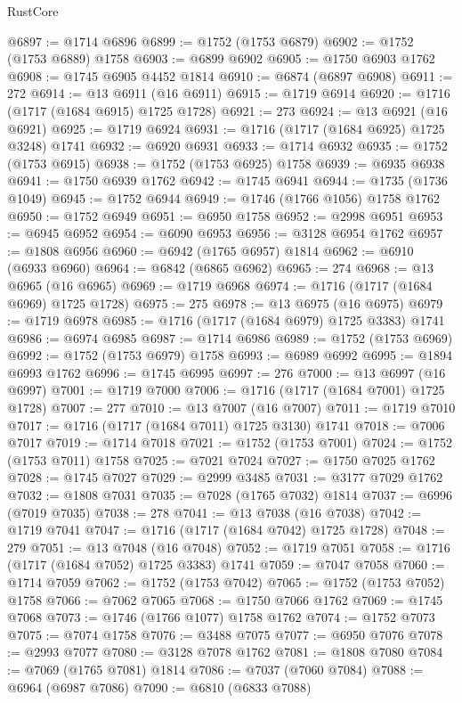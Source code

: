 \begin{lexlean}{RustCore}
\begin{coremodule}
@6897 := @1714 @6896
@6899 := @1752 (@1753 @6879)
@6902 := @1752 (@1753 @6889) @1758
@6903 := @6899 @6902
@6905 := @1750 @6903 @1762
@6908 := @1745 @6905 @4452 @1814
@6910 := @6874 (@6897 @6908)
@6911 := 272
@6914 := @13 @6911 (@16 @6911)
@6915 := @1719 @6914
@6920 := @1716 (@1717 (@1684 @6915) @1725 @1728)
@6921 := 273
@6924 := @13 @6921 (@16 @6921)
@6925 := @1719 @6924
@6931 := @1716 (@1717 (@1684 @6925) @1725 @3248) @1741
@6932 := @6920 @6931
@6933 := @1714 @6932
@6935 := @1752 (@1753 @6915)
@6938 := @1752 (@1753 @6925) @1758
@6939 := @6935 @6938
@6941 := @1750 @6939 @1762
@6942 := @1745 @6941
@6944 := @1735 (@1736 @1049)
@6945 := @1752 @6944
@6949 := @1746 (@1766 @1056) @1758 @1762
@6950 := @1752 @6949
@6951 := @6950 @1758
@6952 := @2998 @6951
@6953 := @6945 @6952
@6954 := @6090 @6953
@6956 := @3128 @6954 @1762
@6957 := @1808 @6956
@6960 := @6942 (@1765 @6957) @1814
@6962 := @6910 (@6933 @6960)
@6964 := @6842 (@6865 @6962)
@6965 := 274
@6968 := @13 @6965 (@16 @6965)
@6969 := @1719 @6968
@6974 := @1716 (@1717 (@1684 @6969) @1725 @1728)
@6975 := 275
@6978 := @13 @6975 (@16 @6975)
@6979 := @1719 @6978
@6985 := @1716 (@1717 (@1684 @6979) @1725 @3383) @1741
@6986 := @6974 @6985
@6987 := @1714 @6986
@6989 := @1752 (@1753 @6969)
@6992 := @1752 (@1753 @6979) @1758
@6993 := @6989 @6992
@6995 := @1894 @6993 @1762
@6996 := @1745 @6995
@6997 := 276
@7000 := @13 @6997 (@16 @6997)
@7001 := @1719 @7000
@7006 := @1716 (@1717 (@1684 @7001) @1725 @1728)
@7007 := 277
@7010 := @13 @7007 (@16 @7007)
@7011 := @1719 @7010
@7017 := @1716 (@1717 (@1684 @7011) @1725 @3130) @1741
@7018 := @7006 @7017
@7019 := @1714 @7018
@7021 := @1752 (@1753 @7001)
@7024 := @1752 (@1753 @7011) @1758
@7025 := @7021 @7024
@7027 := @1750 @7025 @1762
@7028 := @1745 @7027
@7029 := @2999 @3485
@7031 := @3177 @7029 @1762
@7032 := @1808 @7031
@7035 := @7028 (@1765 @7032) @1814
@7037 := @6996 (@7019 @7035)
@7038 := 278
@7041 := @13 @7038 (@16 @7038)
@7042 := @1719 @7041
@7047 := @1716 (@1717 (@1684 @7042) @1725 @1728)
@7048 := 279
@7051 := @13 @7048 (@16 @7048)
@7052 := @1719 @7051
@7058 := @1716 (@1717 (@1684 @7052) @1725 @3383) @1741
@7059 := @7047 @7058
@7060 := @1714 @7059
@7062 := @1752 (@1753 @7042)
@7065 := @1752 (@1753 @7052) @1758
@7066 := @7062 @7065
@7068 := @1750 @7066 @1762
@7069 := @1745 @7068
@7073 := @1746 (@1766 @1077) @1758 @1762
@7074 := @1752 @7073
@7075 := @7074 @1758
@7076 := @3488 @7075
@7077 := @6950 @7076
@7078 := @2993 @7077
@7080 := @3128 @7078 @1762
@7081 := @1808 @7080
@7084 := @7069 (@1765 @7081) @1814
@7086 := @7037 (@7060 @7084)
@7088 := @6964 (@6987 @7086)
@7090 := @6810 (@6833 @7088)

\end{coremodule}
\end{lexlean}
